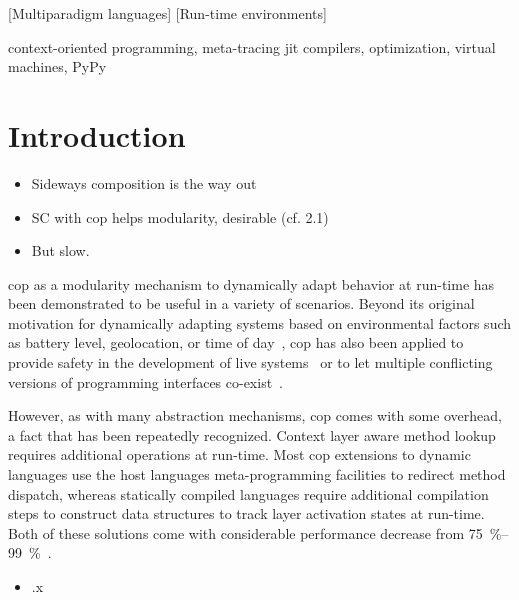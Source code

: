 \documentclass[preprint,english,10pt,nonatbib]{sigplanconf}
\begin{document}
[Mul\-ti\-par\-a\-digm languages]
[Run-time environments]

\keywords
context-oriented programming,
meta-tracing \acs{jit} compilers,
optimization,
virtual machines,
PyPy

\section{Introduction}

\begin{itemize}
\item Sideways composition is the way out
\item SC with cop helps modularity, desirable (cf. 2.1)
\item But slow.
\end{itemize}

\ac{cop} as a modularity mechanism to dynamically adapt behavior at run-time has
been demonstrated to be useful in a variety of scenarios. Beyond its original
motivation for dynamically adapting systems based on environmental factors such
as battery level, geolocation, or time of day~, \ac{cop} has also
been applied to provide safety in the development of live
systems~\cite{lincke+:2012:scoping-changes} or to let multiple conflicting
versions of programming interfaces co-exist~.


However, as with many abstraction mechanisms, \ac{cop} comes with some overhead,
a fact that has been repeatedly recognized. Context layer aware method lookup
requires additional operations at run-time. Most \ac{cop} extensions to dynamic
languages use the host languages meta-programming facilities to redirect method
dispatch, whereas statically compiled languages require additional compilation
steps to construct data structures to track layer activation states at
run-time. Both of these solutions come with considerable performance decrease
from \SIrange{75}{99}{\percent}~\cite{appeltauer+:2009:comparison-context-oriented}.

\begin{itemize}
\item .x
\end{itemize}

\end{document}
